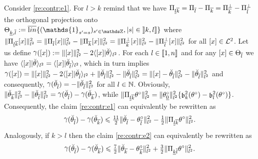 %                                                                 
% 
%
\begin{pro}\label{pro:re:contr}
Consider \ref{re:contr:e1}. For $l>k$ remind that we have 
 $\dProj{k}{l}=\Proj[l]-\Proj[k]=\ProjC[k]-\ProjC[l]$ the
orthogonal projection onto $\dmHiH{k}{l}:=\lin\{(\mathds{1}_{s' = s})_{s' \in \Z},|s|\in\nsetlo{k,l}\}$
where
$\Vnormlp{\dProj{k}{l}\He}^2=\Vnormlp{\dProj{l}{}\He}^2-\Vnormlp{\dProj{k}{}\He}^2=\Vnormlp{\dProjC{k}{}\He}^2-\Vnormlp{\dProjC{l}{}\He}^2$
for all $\He\in\mathcal{L}^{2}$. 
Let us define
$\contr[](\He):=\Vnormlp{\He}^2-2\Vskalarlp{\He \vert \dxdfPr[]}$. For
each $l\in\nset{1,n}$ and for any $\He\in\mHiH[l]$ we have
$\Vskalarlp{\He \vert \dxdfPr[]}=\Vskalarlp{\He\vert\dxdfPr[l]}$, which in
turn implies $\contr[](\He)=\Vnormlp{\He}^2-2\Vskalarlp{\He\vert\dxdfPr[l]}+\Vnormlp{\dxdfPr[l]}^2-\Vnormlp{\dxdfPr[l]}^2=\Vnormlp{\He-\dxdfPr[l]}^2-\Vnormlp{\dxdfPr[l]}^2$
and consequently, $\contr[](\dxdfPr[l])=-\Vnormlp{\dxdfPr[l]}^2$ for all
$l\in\Nz$. Obviously,
$\Vnormlp{\dxdfPr[k]}^2-\Vnormlp{\dxdfPr[l]}^2=\contr[](\dxdfPr[l])-\contr[](\dxdfPr[k])$,
while
$\Vnormlp{\dProj{k}{l}\xdf}^2=\Vnormlp{\xdf_{\underline{0}}}^2\{\bias[k]^2(\xdf)-\bias[l]^2(\xdf)\}$. Consequently,
the claim \ref{re:contr:e1} can equivalently be rewritten as
\begin{equation}\label{re:contr:pr1}
\contr[](\dxdfPr[l])-\contr[](\dxdfPr[k])
\leq \tfrac{11}{2}\Vnormlp{\dxdfPr[l]-\xdfPr[l]}^2-\tfrac{1}{2}\Vnormlp{\dProj{k}{l}\xdf}^2.
\end{equation}
Analogously, if $k>l$ then the claim \ref{re:contr:e2} can equivalently be rewritten as
\begin{equation}\label{re:contr:pr2}
\contr[](\dxdfPr[l])-\contr[](\dxdfPr[k])
\leq \tfrac{7}{2}\Vnormlp{\dxdfPr[k]-\xdfPr[k]}^2+\tfrac{3}{2}
\Vnormlp{\dProj{l}{k}\xdf}^2.
\end{equation}


\end{pro}
